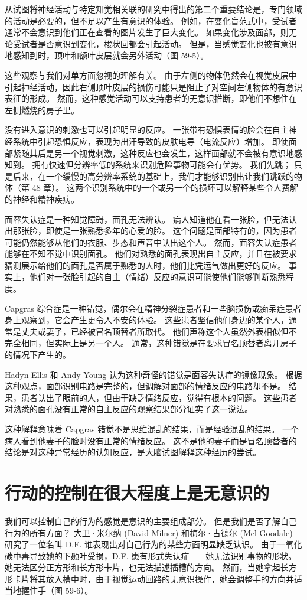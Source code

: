 从试图将神经活动与特定知觉相关联的研究中得出的第二个重要结论是，专门领域的活动是必要的，但不足以产生有意识的体验。 例如，在变化盲范式中，受试者通常不会意识到他们正在查看的图片发生了巨大变化。 如果变化涉及面部，则无论受试者是否意识到变化，梭状回都会引起活动。 但是，当感觉变化也被有意识地感知到时，顶叶和额叶皮层就会另外活动（图 59-5）。

这些观察与我们对单方面忽视的理解有关。 由于左侧的物体仍然会在视觉皮层中引起神经活动，因此右侧顶叶皮层的损伤可能只是阻止了对空间左侧物体的有意识表征的形成。 然而，这种感觉活动可以支持患者的无意识推断，即他们不想住在左侧燃烧的房子里。

没有进入意识的刺激也可以引起明显的反应。 一张带有恐惧表情的脸会在自主神经系统中引起恐惧反应，表现为出汗导致的皮肤电导（电流反应）增加。 即使面部紧随其后是另一个视觉刺激，这种反应也会发生，这样面部就不会被有意识地感知到。 拥有快速但分辨率低的系统来识别危险事物可能会有优势。 我们先跳； 只是后来，在一个缓慢的高分辨率系统的基础上，我们才能够识别出让我们跳跃的物体（第 48 章）。 这两个识别系统中的一个或另一个的损坏可以解释某些令人费解的神经和精神疾病。

面容失认症是一种知觉障碍，面孔无法辨认。 病人知道他在看一张脸，但无法认出那张脸，即使是一张熟悉多年的心爱的脸。 这个问题是面部特有的，因为患者可能仍然能够从他们的衣服、步态和声音中认出这个人。 然而，面容失认症患者能够在不知不觉中识别面孔。 他们对熟悉的面孔表现出自主反应，并且在被要求猜测展示给他们的面孔是否属于熟悉的人时，他们比凭运气做出更好的反应。 事实上，他们对一张脸引起的自主（情绪）反应的意识可能使他们能够判断熟悉程度。

Capgras 综合症是一种错觉，偶尔会在精神分裂症患者和一些脑损伤或痴呆症患者身上观察到，它会产生更令人不安的体验。 这些患者坚信他们身边的某个人，通常是丈夫或妻子，已经被冒名顶替者所取代。 他们声称这个人虽然外表相似但不完全相同，但实际上是另一个人。 通常，这种错觉是在要求冒名顶替者离开房子的情况下产生的。

Hadyn Ellis 和 Andy Young 认为这种奇怪的错觉是面容失认症的镜像现象。 根据这种观点，面部识别电路是完整的，但调解对面部的情绪反应的电路却不是。 结果，患者认出了眼前的人，但由于缺乏情绪反应，觉得有根本的问题。 这些患者对熟悉的面孔没有正常的自主反应的观察结果部分证实了这一说法。

这种解释意味着 Capgras 错觉不是思维混乱的结果，而是经验混乱的结果。 一个病人看到他妻子的脸时没有正常的情绪反应。 这不是他的妻子而是冒名顶替者的结论是对这种异常经历的认知反应，是大脑试图解释这种经历的尝试。

\section{行动的控制在很大程度上是无意识的}
我们可以控制自己的行为的感觉是意识的主要组成部分。 但是我们是否了解自己行为的所有方面？ 大卫·米尔纳 (David Milner) 和梅尔·古德尔 (Mel Goodale) 研究了一位名叫 D.F. 谁表现出对自己行为的某些方面明显缺乏认识。 由于一氧化碳中毒导致她的下颞叶受损，D.F. 患有形式失认症——她无法识别事物的形状。 她无法区分正方形和长方形卡片，也无法描述插槽的方向。 然而，当她拿起长方形卡片将其放入槽中时，由于视觉运动回路的无意识操作，她会调整手的方向并适当地握住手（图 59-6）。

